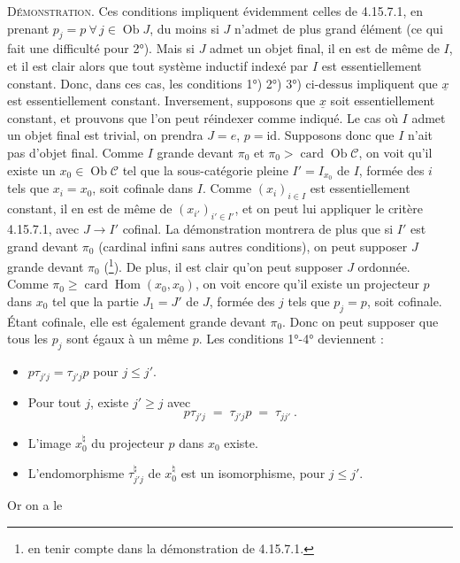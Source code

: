 \documentclass[11pt]{article}
\newcommand{\msp}[1]{\marginpar{\footnotesize [#1]}}
\newcommand{\cC}{\mathcal{C}}
\newcommand{\Ob}{\operatorname{Ob}}
\newcommand{\Hom}{\operatorname{Hom}}
\newcommand{\id}{\mathrm{id}}
\newcommand{\card}{\operatorname{card}}
\newcommand{\ux}{\underline{x}}
\begin{document}
\textsc{Démonstration}. Ces conditions impliquent évidemment celles de 4.15.7.1, en prenant $p_j = p\ \forall\, j \in \Ob J$, du moins si $J$ n'admet de plus grand élément (ce qui fait une difficulté pour 2°). Mais si $J$ admet un objet final, il en est de même de $I$, et il est clair alors que tout système inductif indexé par $I$ est essentiellement constant. Donc, dans ces cas, les conditions 1°) 2°) 3°) ci-dessus impliquent que $\ux$ est essentiellement constant. Inverse\msp{page 444}ment, supposons que $\ux$ soit essentiellement constant, et prouvons que l'on peut réindexer comme indiqué. Le cas où $I$ admet un objet final est trivial, on prendra $J = e$, $p = \id$. Supposons donc que $I$ n'ait pas d'objet final. Comme $I$ grande devant $\pi_0$ et $\pi_0 > \card\Ob\cC$, on voit qu'il existe un $x_0 \in \Ob\cC$ tel que la sous-catégorie pleine $I' = I_{x_0}$ de $I$, formée des $i$ tels que $x_i = x_0$, soit cofinale dans $I$. Comme $(x_i)_{i\in I}$ est essentiellement constant, il en est de même de $(x_{i'})_{i'\in I'}$, et on peut lui appliquer le critère 4.15.7.1, avec \marginpar{$\Vert$}%
$J \longrightarrow I'$ cofinal. La démonstration montrera de plus que si $I'$ est grand devant $\pi_0$ (cardinal infini sans autres conditions), on peut supposer $J$ grande devant $\pi_0$ (\footnote{en tenir compte dans la démonstration de 4.15.7.1.}). De plus, il est clair qu'on peut supposer $J$ ordonnée. Comme $\pi_0 \geqslant \card\Hom(x_0,x_0)$, on voit encore qu'il existe un projecteur $p$ dans $x_0$ tel que la partie $J_1 = J'$ de $J$, formée des $j$ tels que $p_j = p$, soit cofinale. Étant cofinale, elle est également grande devant $\pi_0$. Donc on peut supposer que tous les $p_j$ sont égaux à un même $p$. Les conditions 1°-4° deviennent :
\begin{itemize}
\item[1°)] $p\tau_{j'j} = \tau_{j'j}p$ pour $j \leqslant j'$.
\item[2°)] Pour tout $j$, existe $j' \geqslant j$ avec
\[
p\tau_{j'j} \;=\; \tau_{j'j}p \;=\; \tau_{jj'}\ . %
\]
\item[3°)] L'image $x_0^\natural$ du projecteur $p$ dans $x_0$ existe.
\item[4°)] L'endomorphisme $\tau^\natural_{j'j}$ de $x_0^\natural$ est un isomorphisme, pour $j \leqslant j'$.
\end{itemize}
\msp{page 445}
Or on a le
\end{document}
